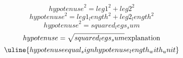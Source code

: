 \[ {hypotenuse}^{2}={leg1}^{2}+{leg2}^{2} \]
\[ {hypotenuse}^{2}={leg1_length}^{2}+{leg2_length}^{2} \]
\[ {hypotenuse}^{2}={squared_legs_sum}\]
\[ {hypotenuse}=\sqrt{\mathstrut {squared_legs_sum}}\text{{explanation}}\]
\[ \uline{{hypotenuse}{equal_sign}{hypotenuse_length_with_unit}}\]